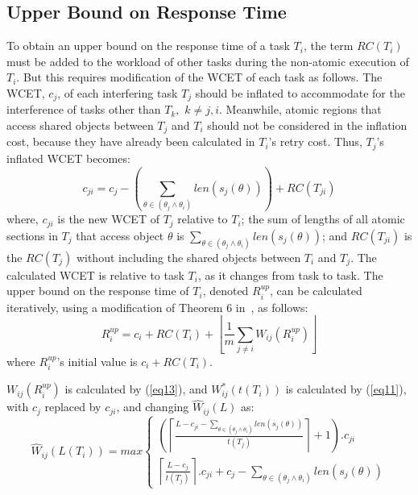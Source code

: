 \documentclass[a4paper,english]{article}
\begin{document}
\subsection{Upper Bound on Response Time}

To obtain an upper bound on the response time of a task $T_{i}$, the term $RC(T_{i})$ must be added to the workload of other tasks during the non-atomic
execution of $T_{i}$. But this requires modification of the WCET of each
task as follows. 
The WCET, $c_{j}$, of each interfering task $T_{j}$ should be inflated to accommodate for the interference of tasks other than $T_{k},$ $k\ne j,i$. Meanwhile, atomic regions that access shared objects between $T_{j}$ and $T_{i}$ should not be considered in the inflation cost, because they have already been calculated in $T_{i}$'s retry cost. Thus, $T_{j}$'s inflated WCET becomes:
\begin{equation}
c_{ji}=c_{j}-\left(\sum_{\theta\in(\theta_{j}\wedge\theta_{i})}len \left(s_{j}(\theta) \right) \right)+RC(T_{ji})\label{eq9}\end{equation}
where, $c_{ji}$ is the new WCET of $T_{j}$ relative to $T_{i}$; 
the sum of lengths of all atomic sections in $T_{j}$ that access object $\theta$ is $\sum_{\theta \in (\theta_j \wedge \theta_i)} {len(s_{j}(\theta))}$; and $RC(T_{ji})$ is the $RC(T_j)$ 
 without including the shared objects between $T_{i}$ and $T_{j}$.
The calculated WCET is relative to task $T_{i}$, as it changes from task to task. The upper bound on the response time of $T_{i}$, denoted $R_{i}^{up}$, can be calculated iteratively, using a modification of Theorem 6 in~\cite{key-2}, as follows:
\begin{equation}
R_{i}^{up}=c_{i}+RC(T_{i})+\left\lfloor\frac{1}{m}\sum_{j\ne i}W_{ij}(R_{i}^{up})\right\rfloor
\label{eq10}
\end{equation}
where $R_{i}^{up}$'s initial value is $c_{i}+RC(T_{i})$.

$W_{ij}(R_{i}^{up})$ is calculated by (\ref{eq13}), and $W_{ij}^{*}(t(T_{i}))$
is calculated by (\ref{eq11}), with $c_{j}$ replaced by 
$c_{ji}$, and changing $\hat{W}_{ij}(L)$ as:
\begin{equation}
\hat{W}_{ij}(L(T_{i}))=max\begin{cases}
\left(\left\lceil\frac{L-c_{ji}-\sum_{\theta\in(\theta_{j}\wedge\theta_{i})}len(s_{j}(\theta))}{t(T_{j})}\right\rceil+1 \right).c_{ji}\\
\left\lceil\frac{L-c_{j}}{t(T_{j})}\right\rceil.c_{ji}+c_{j}-\sum_{\theta\in(\theta_{j}\wedge\theta_{i})}len(s_{j}(\theta))\end{cases}\label{eq14}\end{equation}
\end{document}
